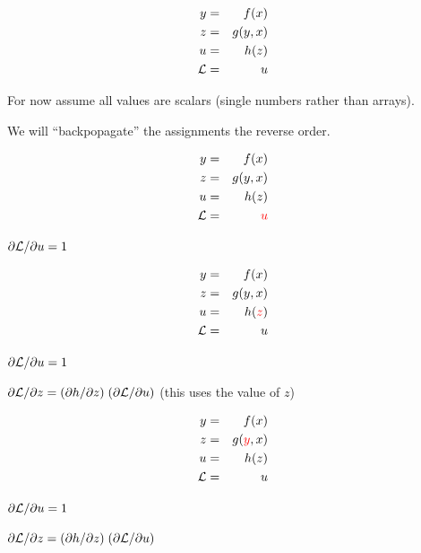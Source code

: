 {
\vspace{-3ex}
\begin{eqnarray*}
  y & = & f(x) \\
  z & = & g(y,x) \\
  u & = & h(z) \\
  {\cal L} & = & u
\end{eqnarray*}

\medskip
For now assume all values are scalars (single numbers rather than arrays).

\medskip
We will ``backpopagate'' the assignments the reverse order.

\vspace{-3ex}
\begin{eqnarray*}
  y & = & f(x) \\
  z & = & g(y,x) \\
  u & = & h(z) \\
  {\cal L} &  = & {\color{red} u}
\end{eqnarray*}

\medskip
{\color{red} ${\partial {\cal L}}/{\partial u} = 1$}

\vspace{-3ex}
\begin{eqnarray*}
  y & = & f(x) \\
  z & = & g(y,x) \\
  u & = & h({\color{red} z}) \\
  {\cal L} &  = &  u
\end{eqnarray*}

\medskip
${\partial {\cal L}}/{\partial u} = 1$

\medskip
{\color{red} ${\partial {\cal L}}/{\partial z} = ({\partial h}/{\partial z})\; ({\partial {\cal L}}/{\partial u})$} (this uses the value of $z$)

\vspace{-3ex}
\begin{eqnarray*}
  y & = & f(x) \\
  z & = & g({\color{red} y},x) \\
  u & = & h(z) \\
  {\cal L} &  = &  u
\end{eqnarray*}

\medskip
${\partial {\cal L}}/{\partial u} = 1$

\medskip
${\partial {\cal L}}/{\partial z} = ({\partial h}/{\partial z}) \; ({\partial {\cal L}}/{\partial u})$

}

